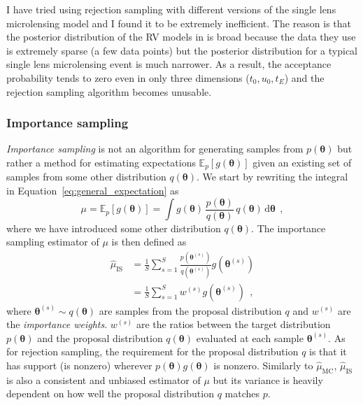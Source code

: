 \documentclass[12pt,dvipsnames]{report}
\newcommand{\ud}{\,\mathrm{d}}
\renewcommand{\vec}[1]{\boldsymbol{\mathbf{#1}}}
\newcommand{\hquad}{~~}
\begin{document}
I have tried using rejection sampling with different versions of the
single lens microlensing model and I found it to be extremely inefficient. The reason is that 
the posterior distribution of the RV models in \citet{2017ApJ...837...20P} is broad because 
the data they use is extremely sparse (a few data points) but the posterior 
distribution for a typical single lens microlensing event is much narrower. 
As a result, the acceptance probability tends to zero even in only three dimensions 
($t_0, u_0, t_E$) and the rejection sampling algorithm becomes unusable. 

\subsubsection{Importance sampling}
\emph{Importance sampling} is not an algorithm for generating samples from
$p(\vec{\theta})$ but rather a method for estimating expectations
$\mathbb{E}_p[g(\vec{\theta})]$ given an existing set of samples from
some other distribution $q(\vec{\theta})$. We start by rewriting the integral 
in Equation~\ref{eq:general_expectation} as 
\begin{equation}
    \mu = \mathbb{E}_{p}[g(\vec \theta)]=\int g(\vec \theta)\,\frac{p(\vec \theta)}{q(\vec \theta)}\,q(\vec \theta) \ud \vec \theta
    \hquad,
\end{equation}
where we have introduced some other distribution $q(\vec \theta)$.
The importance sampling estimator of $\mu$ is then defined as
\begin{align}
    \hat{\mu}_{\mathrm{IS}}&=\frac{1}{S} \sum_{s=1}^{S} \frac{p\left(\boldsymbol{\theta}^{(s)}\right)}{q\left(\boldsymbol{\theta}^{(s)}\right)} g\left(\boldsymbol{\theta}^{(s)}\right)\\
    &=\frac{1}{S} \sum_{s=1}^{S} w^{(s)} g\left(\boldsymbol{\theta}^{(s)}\right)
    \hquad,
\end{align}
where  $\boldsymbol{\theta}^{(s)} \sim q(\boldsymbol{\theta})$ are samples from the 
proposal distribution $q$ and $w^{(s)}$ are the \emph{importance weights}. 
$w^{(s)}$  are the ratios between the target distribution $p(\vec \theta)$ and 
the proposal distribution $q(\vec \theta)$ evaluated at each sample $\vec{\theta}^{(s)}$.
As for rejection sampling, the requirement for the proposal distribution $q$
is that it has support (is nonzero) wherever $p(\boldsymbol{\theta}) g(\boldsymbol{\theta})$
is nonzero.
Similarly to $\hat{\mu}_{\mathrm{MC}}$,  $\hat{\mu}_{\mathrm{IS}}$ is also a 
consistent and  unbiased estimator of $\mu$ but its variance is heavily dependent on 
how well the proposal distribution $q$ matches $p$. 
\end{document}
